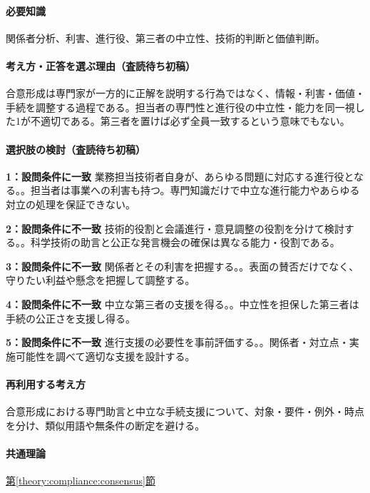 \paragraph{必要知識} 関係者分析、利害、進行役、第三者の中立性、技術的判断と価値判断。

\paragraph{考え方・正答を選ぶ理由（査読待ち初稿）} 合意形成は専門家が一方的に正解を説明する行為ではなく、情報・利害・価値・手続を調整する過程である。担当者の専門性と進行役の中立性・能力を同一視した1が不適切である。第三者を置けば必ず全員一致するという意味でもない。

\paragraph{選択肢の検討（査読待ち初稿）}\mbox{}\par

\noindent\textbf{1：設問条件に一致} 業務担当技術者自身が、あらゆる問題に対応する進行役となる。。担当者は事業への利害も持つ。専門知識だけで中立な進行能力やあらゆる対立の処理を保証できない。\par

\noindent\textbf{2：設問条件に不一致} 技術的役割と会議進行・意見調整の役割を分けて検討する。。科学技術の助言と公正な発言機会の確保は異なる能力・役割である。\par

\noindent\textbf{3：設問条件に不一致} 関係者とその利害を把握する。。表面の賛否だけでなく、守りたい利益や懸念を把握して調整する。\par

\noindent\textbf{4：設問条件に不一致} 中立な第三者の支援を得る。。中立性を担保した第三者は手続の公正さを支援し得る。\par

\noindent\textbf{5：設問条件に不一致} 進行支援の必要性を事前評価する。。関係者・対立点・実施可能性を調べて適切な支援を設計する。\par

\paragraph{再利用する考え方} 合意形成における専門助言と中立な手続支援について、対象・要件・例外・時点を分け、類似用語や無条件の断定を避ける。

\paragraph{共通理論} \hyperref[theory:compliance:consensus]{第\ref*{theory:compliance:consensus}節}

